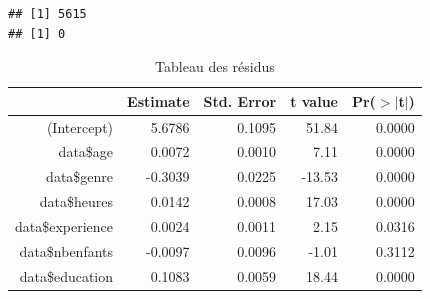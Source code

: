 \documentclass[a4paper, french, 11 pt]{article}\usepackage[]{graphicx}\usepackage[]{xcolor}
\makeatletter
\newenvironment{kframe}{%
 \def\at@end@of@kframe{}%
 \ifinner\ifhmode%
  \def\at@end@of@kframe{\end{minipage}}%
  \begin{minipage}{\columnwidth}%
 \fi\fi%
 \def\FrameCommand##1{\hskip\@totalleftmargin \hskip-\fboxsep
 \colorbox{shadecolor}{##1}\hskip-\fboxsep
     \hskip-\linewidth \hskip-\@totalleftmargin \hskip\columnwidth}%
 \MakeFramed {\advance\hsize-\width
   \@totalleftmargin\z@ \linewidth\hsize
   \@setminipage}}%
 {\par\unskip\endMakeFramed%
 \at@end@of@kframe}
\newenvironment{knitrout}{}{} %
\makeatother
\begin{document}
\begin{knitrout}
\color{fgcolor}\begin{kframe}
\begin{verbatim}
## [1] 5615
## [1] 0
\end{verbatim}
\end{kframe}
\end{knitrout}


\begin{table}[ht]
\centering
\caption{Tableau des résidus} 
\label{tb:lm1}
\begin{tabular}{rrrrr}
  \toprule
 & Estimate & Std. Error & t value & Pr($>$$|$t$|$) \\ 
  \midrule
(Intercept) & 5.6786 & 0.1095 & 51.84 & 0.0000 \\ 
  data\$age & 0.0072 & 0.0010 & 7.11 & 0.0000 \\ 
  data\$genre & -0.3039 & 0.0225 & -13.53 & 0.0000 \\ 
  data\$heures & 0.0142 & 0.0008 & 17.03 & 0.0000 \\ 
  data\$experience & 0.0024 & 0.0011 & 2.15 & 0.0316 \\ 
  data\$nbenfants & -0.0097 & 0.0096 & -1.01 & 0.3112 \\ 
  data\$education & 0.1083 & 0.0059 & 18.44 & 0.0000 \\ 
   \bottomrule
\end{tabular}
\end{table}
\end{document}

